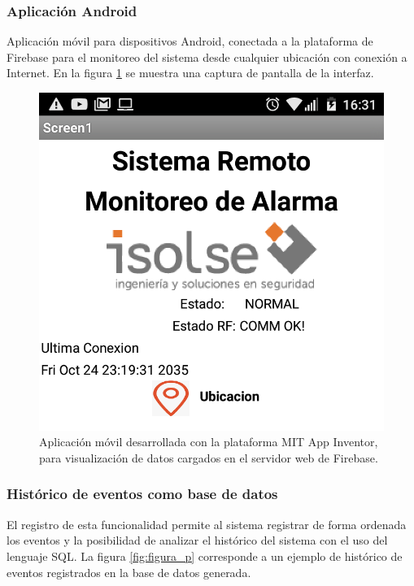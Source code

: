 \subsubsection{Aplicación Android}
Aplicación móvil para dispositivos Android, conectada a la plataforma de Firebase para el monitoreo del sistema desde cualquier ubicación con conexión a Internet. En la figura \ref{fig:figura_n} se muestra una captura de pantalla de la interfaz.

\begin{figure}[ht]
	\centering
	\includegraphics[scale=.35]{./Figures/Capitulo4/Figura_N.png}
	\caption{Aplicación móvil desarrollada con la plataforma MIT App Inventor, para visualización de datos cargados en el servidor web de Firebase.}
	\label{fig:figura_n}
\end{figure}

\subsubsection{Histórico de eventos como base de datos}
El registro de esta funcionalidad permite al sistema registrar de forma ordenada los eventos y la posibilidad de analizar el histórico del sistema con el uso del lenguaje SQL. La figura \ref{fig:figura_p} corresponde a un ejemplo de histórico de eventos registrados en la base de datos generada.

